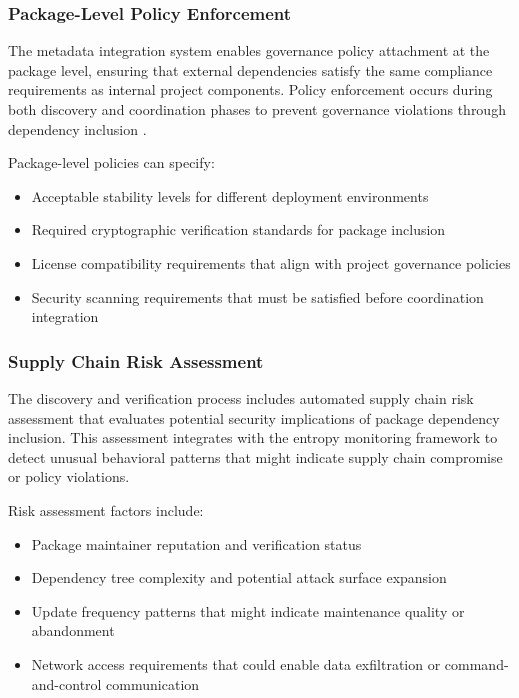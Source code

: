 \subsubsection{Package-Level Policy Enforcement}

The metadata integration system enables governance policy attachment at the package level, ensuring that external dependencies satisfy the same compliance requirements as internal project components. Policy enforcement occurs during both discovery and coordination phases to prevent governance violations through dependency inclusion \cite{TODO:pkg-system-governance}.

Package-level policies can specify:
\begin{itemize}
\item Acceptable stability levels for different deployment environments
\item Required cryptographic verification standards for package inclusion
\item License compatibility requirements that align with project governance policies
\item Security scanning requirements that must be satisfied before coordination integration
\end{itemize}

\subsubsection{Supply Chain Risk Assessment}

The discovery and verification process includes automated supply chain risk assessment that evaluates potential security implications of package dependency inclusion. This assessment integrates with the entropy monitoring framework to detect unusual behavioral patterns that might indicate supply chain compromise or policy violations.

Risk assessment factors include:
\begin{itemize}
\item Package maintainer reputation and verification status
\item Dependency tree complexity and potential attack surface expansion
\item Update frequency patterns that might indicate maintenance quality or abandonment
\item Network access requirements that could enable data exfiltration or command-and-control communication
\end{itemize}

